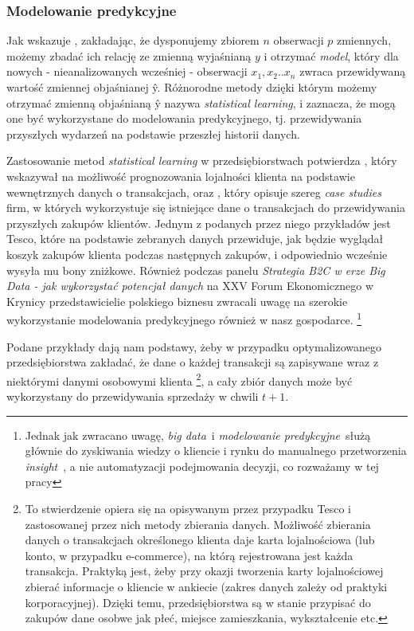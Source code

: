 \documentclass[polish, twoside, 12pt, a4paper]{article}
\theoremstyle{definition}
\theoremstyle{plain}
\theoremstyle{remark}
\begin{document}
\subsubsection{Modelowanie predykcyjne} 
Jak wskazuje \cite{James2013}, zakładając, że dysponujemy zbiorem $n$ obserwacji $p$ zmiennych, możemy zbadać ich relację ze zmienną wyjaśnianą $y$ i otrzymać \textit{model}, który dla nowych - nieanalizowanych wcześniej - obserwacji $x_1,x_2..x_n$  zwraca przewidywaną wartość zmiennej objaśnianej \^{y}. Różnorodne metody dzięki którym możemy otrzymać zmienną objaśnianą \^{y} \cite{James2013} nazywa \textit{statistical learning}, i zaznacza, że mogą one być wykorzystane do modelowania predykcyjnego, tj. przewidywania przyszłych wydarzeń na podstawie przeszłej historii danych. 

Zastosowanie metod \textit{statistical learning} w przedsiębiorstwach potwierdza \cite{Buckinx2007}, który wskazywał na możliwość prognozowania lojalności klienta na podstawie wewnętrznych danych o transakcjach, oraz \cite{Davenport2011}, który opisuje szereg  \textit{case studies} firm, w których wykorzystuje się istniejące dane o transakcjach do przewidywania przyszłych zakupów klientów. Jednym z podanych przez niego przykładów jest Tesco, które na podstawie zebranych danych przewiduje, jak będzie wyglądał koszyk zakupów klienta podczas następnych zakupów, i odpowiednio wcześnie wysyła mu bony zniżkowe. Również podczas panelu \textit{Strategia B2C w erze Big Data - jak wykorzystać potencjał danych} na XXV Forum Ekonomicznego w Krynicy przedstawicielie polskiego biznesu zwracali uwagę na szerokie wykorzystanie modelowania predykcyjnego również w nasz gospodarce. \footnote{Jednak jak zwracano uwagę, \textit{big data}\ i \textit{modelowanie predykcyjne}\ służą głównie do zyskiwania wiedzy o kliencie i rynku do manualnego przetworzenia \textit{insight}\ , a nie automatyzacji podejmowania decyzji, co rozważamy w tej pracy}

Podane przykłady dają nam podstawy, żeby w przypadku optymalizowanego przedsiębiorstwa zakładać, że dane o każdej transakcji są zapisywane wraz z niektórymi danymi osobowymi klienta \footnote{To stwierdzenie opiera się na opisywanym przez \cite{Davenport2011} przypadku Tesco i zastosowanej przez nich metody zbierania danych. Możliwość zbierania danych o transakcjach określonego klienta daje karta lojalnościowa (lub konto, w przypadku e-commerce), na którą rejestrowana jest każda transakcja. Praktyką jest, żeby przy okazji tworzenia karty lojalnościowej zbierać informacje o kliencie w ankiecie (zakres danych zależy od praktyki korporacyjnej). Dzięki temu, przedsiębiorstwa są w stanie przypisać do zakupów dane osobwe jak płeć, miejsce zamieszkania, wykształcenie etc.}, a cały zbiór danych może być wykorzystany do przewidywania sprzedaży w chwili $t + 1$. 
\end{document}
